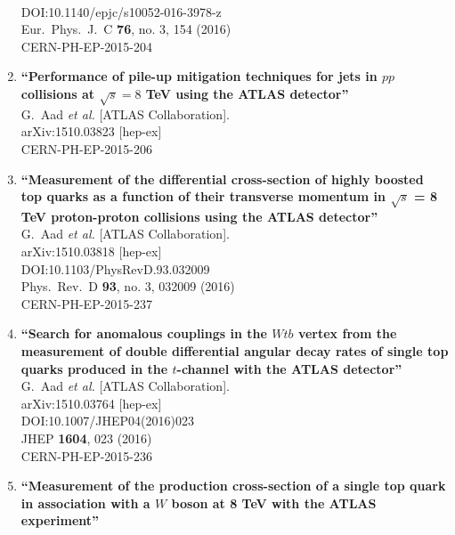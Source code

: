 \documentclass{article}
\begin{document}
\begin{enumerate}
  \\{}DOI:10.1140/epjc/s10052-016-3978-z
  \\{}Eur.\ Phys.\ J.\ C {\bf 76}, no. 3, 154 (2016)
  \\{}CERN-PH-EP-2015-204
\item%
{\bf ``Performance of pile-up mitigation techniques for jets in $pp$ collisions at $\sqrt{s} = 8$ TeV using the ATLAS detector''}
  \\{}G.~Aad {\it et al.} [ATLAS Collaboration].
  \\{}arXiv:1510.03823 [hep-ex]
  \\{}CERN-PH-EP-2015-206
\item%
{\bf ``Measurement of the differential cross-section of highly boosted top quarks as a function of their transverse momentum in $\sqrt{s}$ = 8 TeV proton-proton collisions using the ATLAS detector''}
  \\{}G.~Aad {\it et al.} [ATLAS Collaboration].
  \\{}arXiv:1510.03818 [hep-ex]
  \\{}DOI:10.1103/PhysRevD.93.032009
  \\{}Phys.\ Rev.\ D {\bf 93}, no. 3, 032009 (2016)
  \\{}CERN-PH-EP-2015-237
\item%
{\bf ``Search for anomalous couplings in the $Wtb$ vertex from the measurement of double differential angular decay rates of single top quarks produced in the $t$-channel with the ATLAS detector''}
  \\{}G.~Aad {\it et al.} [ATLAS Collaboration].
  \\{}arXiv:1510.03764 [hep-ex]
  \\{}DOI:10.1007/JHEP04(2016)023
  \\{}JHEP {\bf 1604}, 023 (2016)
  \\{}CERN-PH-EP-2015-236
\item%
{\bf ``Measurement of the production cross-section of a single top quark in association with a $W$ boson at 8 TeV with the ATLAS experiment''}

\end{enumerate}
\end{document}
